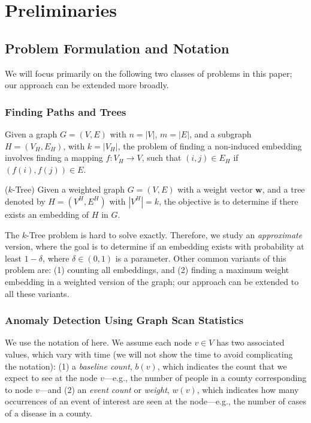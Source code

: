 \section{Preliminaries}
\label{sec:prelim}

\subsection{Problem Formulation and Notation}
We will focus primarily on the following two classes of problems in this paper; our
approach can be extended more broadly.

\noindent
\subsubsection{Finding Paths and Trees}
Given a graph $G=(V, E)$ with $n=|V|$, $m=|E|$, and a subgraph $H=(V_H, E_H)$, with $k=|V_H|$, the problem of finding a non-induced embedding involves finding a mapping $f:V_H\rightarrow V$,
such that $(i, j)\in E_H$ if $(f(i), f(j))\in E$.

\begin{problem} ($k$-Tree)
\label{prob:trees}
Given a weighted graph $G=(V, E)$ with a weight vector $\mathbf{w}$, and a tree
denoted by $H=(V^H, E^H)$ with $|V^H|=k$, the objective is to determine if there exists
an embedding of $H$ in $G$.
\end{problem}

The $k$-Tree problem is hard to solve exactly. Therefore, we study an \emph{approximate} version, where the goal is to determine if an embedding exists with probability at least $1-\delta$, where $\delta\in(0, 1)$ is a parameter.
Other common variants of this problem are: (1) counting all embeddings, and (2) finding a maximum
weight embedding in a weighted version of the graph; our approach can be extended to all
these variants.


\noindent
\subsubsection{Anomaly Detection Using Graph Scan Statistics}
We use the notation of \cite{cadena:sdm17} here. We assume each node $v\in V$ has two associated values,
which vary with time (we will not show the time to avoid complicating the notation):
(1) a \emph{baseline count}, $b(v)$, which indicates the count that we
expect to see at the node $v$---e.g., the number of people in a county corresponding to node $v$---and
(2) an \emph{event count} or \emph{weight}, $w(v)$, which indicates how many occurrences of an event
of interest are seen at the node---e.g., the number of cases of a disease in a county.

